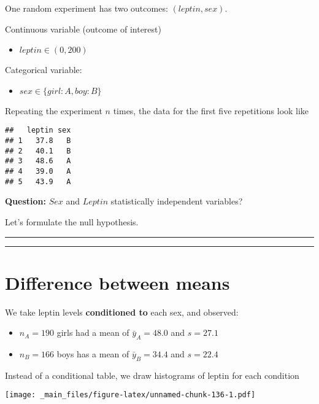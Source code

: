 \documentclass[
]{book}
\providecommand{\tightlist}{%
  \setlength{\itemsep}{0pt}\setlength{\parskip}{0pt}}
\begin{document}
One random experiment has two outcomes: \((leptin, sex)\).

Continuous variable (outcome of interest)

\begin{itemize}
\tightlist
\item
  \(leptin \in (0, 200)\)
\end{itemize}

Categorical variable:

\begin{itemize}
\tightlist
\item
  \(sex \in \{girl:A,boy:B\}\)
\end{itemize}

Repeating the experiment \(n\) times, the data for the first five repetitions look like

\begin{verbatim}
##   leptin sex
## 1   37.8   B
## 2   40.1   B
## 3   48.6   A
## 4   39.0   A
## 5   43.9   A
\end{verbatim}

\textbf{Question:} \(Sex\) and \(Leptin\) statistically independent variables?

Let's formulate the null hypothesis.

\begin{center}\rule{0.5\linewidth}{0.5pt}\end{center}

\begin{center}\rule{0.5\linewidth}{0.5pt}\end{center}

\hypertarget{difference-between-means-3}{%
\section{Difference between means}\label{difference-between-means-3}}

We take leptin levels \textbf{conditioned to} each sex, and observed:

\begin{itemize}
\item
  \(n_A=190\) girls had a mean of \(\bar{y}_A=48.0\) and \(s=27.1\)
\item
  \(n_B=166\) boys has a mean of \(\bar{y}_B=34.4\) and \(s=22.4\)
\end{itemize}

Instead of a conditional table, we draw histograms of leptin for each condition

\texttt{[image: \_main\_files/figure-latex/unnamed-chunk-136-1.pdf]}
\end{document}
